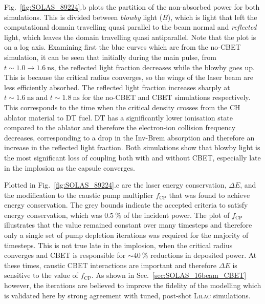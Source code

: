 Fig.~\ref{fig:SOLAS_89224}.b plots the partition of the non-absorbed power for both simulations.
This is divided between \textit{blowby} light ($B$), which is light that left the computational domain travelling quasi parallel to the beam normal and \textit{reflected} light, which leaves the domain travelling quasi antiparallel.
Note that the plot is on a log axis.
Examining first the blue curves which are from the no-\ac{CBET} simulation, it can be seen that initially during the main pulse, from $t\sim 1.0\rightarrow1.6\ \text{ns}$, the reflected light fraction decreases while the blowby goes up.
This is because the critical radius converges, so the wings of the laser beam are less efficiently absorbed.
The reflected light fraction increases sharply at $t \sim 1.6\ \text{ns}$ and $t \sim 1.8\ \text{ns}$ for the no-\ac{CBET} and \ac{CBET} simulations respectively.
This corresponds to the time when the critical density crosses from the CH ablator material to DT fuel.
DT has a significantly lower ionisation state compared to the ablator and therefore the electron-ion collision frequency decreases, corresponding to a drop in the \ac{Inv-Brem} absorption and therefore an increase in the reflected light fraction.
Both simulations show that blowby light is the most significant loss of coupling both with and without \ac{CBET}, especially late in the implosion as the capsule converges.

Plotted in Fig.~\ref{fig:SOLAS_89224}.c are the laser energy conservation, $\Delta E$, and the modification to the caustic pump multiplier $f_{\text{CP}}$ that was found to achieve energy conservation.
The grey bounds indicate the accepted criteria to satisfy energy conservation, which was $0.5\ \%$ of the incident power.
The plot of $f_{\text{CP}}$ illustrates that the value remained constant over many timesteps and therefore only a single set of pump depletion iterations was required for the majority of timesteps.
This is not true late in the implosion, when the critical radius converges and \ac{CBET} is responsible for $\sim40\ \%$ reductions in deposited power.
At these times, caustic \ac{CBET} interactions are important and therefore $\Delta E$ is sensitive to the value of $f_{\text{CP}}$.
As shown in Sec.~\ref{sec:SOLAS_16beam_CBET} however, the iterations are believed to improve the fidelity of the modelling which is validated here by strong agreement with tuned, post-shot \textsc{Lilac} simulations.

